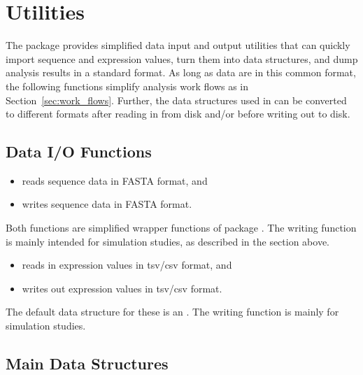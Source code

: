 
\section[Utilities]{Utilities}
\label{sec:utilities}

The  package provides simplified data input and output utilities 
that can quickly import sequence and expression values, turn them into
 data structures, and dump analysis results in a standard format.
As long as data are in this common format, the following functions simplify
analysis work flows as in Section~\ref{sec:work_flows}.
Further, the  data structures used in  can be
converted to different formats after reading in from disk and/or
before writing out to disk.


\subsection[Data I/O Functions]{Data I/O Functions}
\label{sec:data_io}

\begin{itemize}
\item {} reads sequence data in FASTA format, and
\item {} writes sequence data in FASTA format.
\end{itemize}
Both functions are simplified wrapper functions of package .
The writing function is mainly intended for simulation studies, as described in 
the section above.

\begin{itemize}
\item {} reads in expression values in tsv/csv format, and
\item {} writes out expression values in tsv/csv format.
\end{itemize}
The default data structure for these is an  .
The writing function is mainly for simulation studies.


\subsection[Main Data Structures]{Main Data Structures}
\label{sec:main_data_structures}

